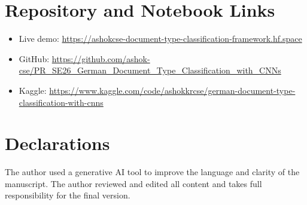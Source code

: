 \documentclass[preprint,12pt]{elsarticle}
\begin{document}
\section*{Repository and Notebook Links}\label{sec:links}
\begin{itemize}
\item Live demo: \url{https://ashokcse-document-type-classification-framework.hf.space}
\item GitHub: \url{https://github.com/ashok-cse/PR_SE26_German_Document_Type_Classification_with_CNNs}
\item Kaggle: \url{https://www.kaggle.com/code/ashokkrcse/german-document-type-classification-with-cnns}
\end{itemize}

\section*{Declarations}
The author used a generative AI tool to improve the language and clarity of the
manuscript.
The author reviewed and edited all content and takes full responsibility for the
final version.



\end{document}
